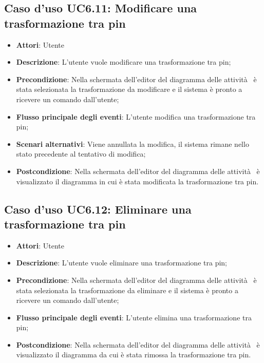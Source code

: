 \documentclass[../AnalisiDeiRequisiti.tex]{subfiles}
\begin{document}
				\subsection{Caso d'uso UC6.11: Modificare una trasformazione tra pin}
				\begin{itemize}
					\item \textbf{Attori}: Utente
					\item \textbf{Descrizione}: L'utente vuole modificare una trasformazione tra pin;
					\item \textbf{Precondizione}: Nella schermata dell'editor del diagramma delle attività  è stata selezionata la trasformazione da modificare e il sistema è pronto a ricevere un comando dall'utente;
					\item \textbf{Flusso principale degli eventi}: L'utente modifica una trasformazione tra pin;
					\item \textbf{Scenari alternativi}: Viene annullata la modifica, il sistema rimane nello stato precedente al tentativo di modifica;
					\item \textbf{Postcondizione}: Nella schermata dell'editor del diagramma delle attività  è visualizzato il diagramma in cui è stata modificata la trasformazione tra pin.
				\end{itemize}
				\subsection{Caso d'uso UC6.12: Eliminare una trasformazione tra pin}
				\begin{itemize}
					\item \textbf{Attori}: Utente
					\item \textbf{Descrizione}: L'utente vuole eliminare una trasformazione tra pin;
					\item \textbf{Precondizione}: Nella schermata dell'editor del diagramma delle attività  è stata selezionata la trasformazione da eliminare e il sistema è pronto a ricevere un comando dall'utente;
					\item \textbf{Flusso principale degli eventi}: L'utente elimina una trasformazione tra pin;
					\item \textbf{Postcondizione}: Nella schermata dell'editor del diagramma delle attività  è visualizzato il diagramma da cui è stata rimossa la trasformazione tra pin.
				\end{itemize}
\end{document}
